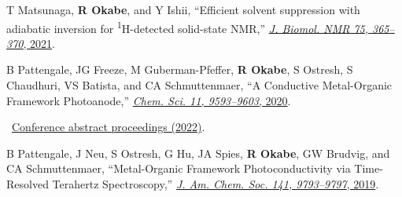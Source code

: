 \documentclass[10pt,a4paper]{article}
\newcommand{\note}[1]{\par{\hspace{1.2em}\textbullet\ #1}}
\newcommand{\me}{\textbf{R Okabe}}
\begin{document}
\begin{cvenum}
  \item T Matsunaga, \me, and Y Ishii, ``Efficient solvent suppression with adiabatic inversion for \textsuperscript{1}H-detected solid-state NMR,'' \href{https://doi.org/10.1007/s10858-021-00384-8}{\textit{J. Biomol. NMR 75, 365--370}, 2021}.
  \item B Pattengale, JG Freeze, M Guberman-Pfeffer, \me, S Ostresh, S Chaudhuri, VS Batista, and CA Schmuttenmaer, ``A Conductive Metal-Organic Framework Photoanode,'' \href{https://doi.org/10.1039/D0SC04302H}{\textit{Chem. Sci. 11, 9593--9603}, 2020}.
    \note{\href{https://www.researchgate.net/profile/Michael-Rafailov/publication/362712589_Ultrafast_Dynamics_Ultrafast_Bandgap_Photonics_VII_Crete_Greece/links/643dd2d239aa471a5245b152/Ultrafast-Dynamics-Ultrafast-Bandgap-Photonics-VII-Crete-Greece.pdf}{Conference abstract proceedings (2022)}.}
  \item B Pattengale, J Neu, S Ostresh, G Hu, JA Spies, \me, GW Brudvig, and CA Schmuttenmaer, ``Metal-Organic Framework Photoconductivity via Time-Resolved Terahertz Spectroscopy,'' \href{https://doi.org/10.1021/jacs.9b04338}{\textit{J. Am. Chem. Soc. 141, 9793--9797}, 2019}.
\end{cvenum}
\end{document}
